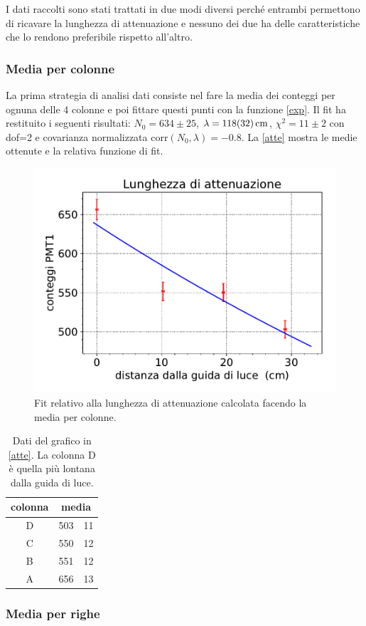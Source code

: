 I dati raccolti sono stati trattati in due modi diversi perché entrambi permettono di ricavare la lunghezza di attenuazione e nessuno dei due ha delle caratteristiche che lo rendono preferibile rispetto all'altro.

\subsubsection{Media per colonne}

La prima strategia di analisi dati consiste nel fare la media dei conteggi per ognuna delle 4 colonne e poi fittare questi punti con la funzione \eqref{exp}.
Il fit ha restituito i seguenti risultati: $N_0=634\pm25$,  $\lambda=\SI{118\pm32}{cm}$, $\chi^2=11\pm2$ con dof=2 e covarianza normalizzata corr$(N_0,\lambda)=-0.8$. 
La \autoref{atte} mostra le medie ottenute e la relativa funzione di fit.
\begin{figure}[h]
\centering
\includegraphics[width=8 cm]{atte}
\caption{Fit relativo alla lunghezza di attenuazione calcolata facendo la media per colonne.}
\label{atte}
\end{figure}

\begin{table}[h]
\centering
\begin{tabular}{| c | r @{$\pm$} l |}
\hline
colonna & \multicolumn{2}{c|}{media} \\
\hline
D & 503&11 \\
C & 550&12 \\
B & 551&12 \\
A & 656&13 \\
\hline
\end{tabular}
\caption{Dati del grafico in \autoref{atte}. La colonna D è quella più lontana dalla guida di luce.}
\end{table}

\subsubsection{Media per righe}

